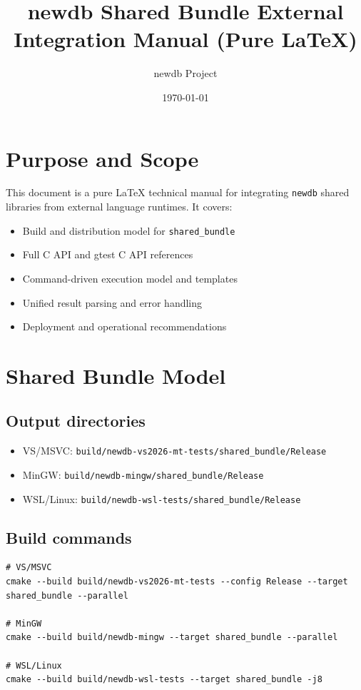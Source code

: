 \documentclass[11pt,a4paper]{article}
\title{newdb Shared Bundle External Integration Manual (Pure LaTeX)}
\author{newdb Project}
\date{\today}
\begin{document}
\maketitle
\tableofcontents
\newpage

\section{Purpose and Scope}
This document is a pure LaTeX technical manual for integrating \texttt{newdb}
shared libraries from external language runtimes. It covers:
\begin{itemize}
  \item Build and distribution model for \texttt{shared\_bundle}
  \item Full C API and gtest C API references
  \item Command-driven execution model and templates
  \item Unified result parsing and error handling
  \item Deployment and operational recommendations
\end{itemize}

\section{Shared Bundle Model}
\subsection{Output directories}
\begin{itemize}
  \item VS/MSVC: \texttt{build/newdb-vs2026-mt-tests/shared\_bundle/Release}
  \item MinGW: \texttt{build/newdb-mingw/shared\_bundle/Release}
  \item WSL/Linux: \texttt{build/newdb-wsl-tests/shared\_bundle/Release}
\end{itemize}

\subsection{Build commands}
\begin{lstlisting}
# VS/MSVC
cmake --build build/newdb-vs2026-mt-tests --config Release --target shared_bundle --parallel

# MinGW
cmake --build build/newdb-mingw --target shared_bundle --parallel

# WSL/Linux
cmake --build build/newdb-wsl-tests --target shared_bundle -j8
\end{lstlisting}
\end{document}
